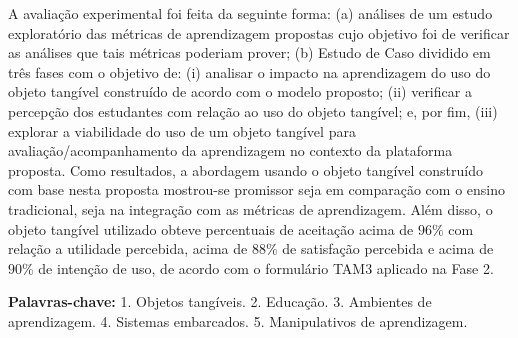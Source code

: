 \begin{resumo}
A avaliação experimental foi feita da seguinte forma: (a) análises de um estudo exploratório das métricas de aprendizagem propostas cujo objetivo foi de verificar as análises que tais métricas poderiam prover; (b) Estudo de Caso dividido em três fases com o objetivo de: (i) analisar o impacto na aprendizagem do uso do objeto tangível construído de acordo com o modelo proposto; (ii) verificar a percepção dos estudantes com relação ao uso do objeto tangível; e, por fim, (iii) explorar a viabilidade do uso de um objeto tangível para avaliação/acompanhamento da aprendizagem no contexto da plataforma proposta. Como resultados, a abordagem usando o objeto tangível construído com base nesta proposta mostrou-se promissor seja em comparação com o ensino tradicional, seja na integração com as métricas de aprendizagem. Além disso, o objeto tangível utilizado obteve percentuais de aceitação acima de $96\%$ com relação a utilidade percebida, acima de $88\%$ de satisfação percebida e acima de $90\%$ de intenção de uso, de acordo com o formulário TAM3 aplicado na Fase 2.

\textbf{Palavras-chave: } 1. Objetos tangíveis. 2. Educação. 3. Ambientes de aprendizagem. 4. Sistemas embarcados. 5. Manipulativos de aprendizagem.


\end{resumo}